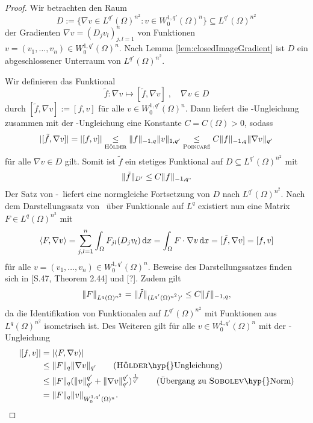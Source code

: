 \begin{proof}
  Wir betrachten den Raum
  $$
  D := \{\nabla v \in L^{q'}(\Omega)^{n^2} \colon v \in W_0^{1,q'}(\Omega)^n\} \subseteq L^{q'}(\Omega)^{n^2}
  $$
  der Gradienten $\nabla v = (D_j v_l)_{j,l=1}^n$ von Funktionen $v = (v_1,\dots,v_n) \in W_0^{1,q'}(\Omega)^n$.
  Nach Lemma \ref{lem:closedImageGradient} ist $D$ ein abgeschlossener Unterraum von $L^{q'}(\Omega)^{n^2}$.

  Wir definieren das Funktional
  $$
  \tilde f \colon \nabla v \mapsto [\tilde f, \nabla v]\;, \quad \nabla v \in D
  $$
  durch $[\tilde f, \nabla v] := [f, v]$ für alle $v \in W_0^{1,q'}(\Omega)^n$.
  Dann liefert die \hoelder\hyp{}Ungleichung zusammen mit der \poincare\hyp{}Ungleichung eine Konstante $C = C(\Omega) > 0$, sodass 
  $$
  |[\tilde f, \nabla v]| 
  = |[f, v]| 
  \underset{\hoelder}{\leq} \norm{f}_{-1,q} \norm{v}_{1,q'}
  \underset{\poincare}{\leq} C \norm{f}_{-1,q} \norm{\nabla v }_{q'}
  $$
  für alle $\nabla v \in D$ gilt.
  Somit ist $\tilde f$ ein stetiges Funktional auf $D \subseteq L^{q'}(\Omega)^{n^2}$ mit 
  $$\norm{\tilde f}_{D'} \leq C\norm{f}_{-1,q}.$$
  Der Satz von \hahn\hyp{}\banach\ liefert eine normgleiche Fortsetzung von $D$ nach $L^{q'}(\Omega)^{n^2}$.
  Nach dem Darstellungssatz von \riesz\ über Funktionale auf $L^{q}$  existiert nun eine Matrix $F \in L^{q}(\Omega)^{n^2}$ mit
  $$
  \langle F, \nabla v \rangle
  = \sum_{j,l=1}^n \int_\Omega F_{jl}(D_j v_l) \d x
  = \int_\Omega F \cdot \nabla v \d x
  = [\tilde f, \nabla v] 
  = [f, v]
  $$
  für alle $v = (v_1,\dots,v_n) \in W_0^{1,q'}(\Omega)^n$.
  Beweise des Darstellungssatzes finden sich in \cite{adams2003sobolev}[S.47, Theorem 2.44] und \cite{werner2011fa}[?].
  Zudem gilt
  $$ \norm{F}_{L^q(\Omega)^{n^2}} = \norm{\tilde f}_{(L^{q'}(\Omega)^{n^2})'} \leq C \norm{f}_{-1,q},$$
  da die Identifikation von Funktionalen auf $L^{q'}(\Omega)^{n^2}$ mit Funktionen aus $L^q(\Omega)^{n^2}$ isometrisch ist.
  Des Weiteren gilt für alle $v \in W_0^{1,q'}(\Omega)^n$ mit der \hoelder\hyp{}Ungleichung
  \begin{align*}
    |[f,v]| 
    &= |\langle F, \nabla v\rangle|  \\
    &\leq \norm{F}_q \norm{\nabla v}_{q'}  \tag{\hoelder\hyp{}Ungleichung}\\
    &\leq \norm{F}_q (\norm{v}_{q'}^{q'} + \norm{\nabla v}_{q'}^{q'})^{\frac{1}{q'}} \tag{Übergang zu \sobolev\hyp{}Norm}\\
    &= \norm{F}_q \norm{v}_{W_0^{1,q'}(\Omega)^n}.
  \end{align*}

\end{proof}
